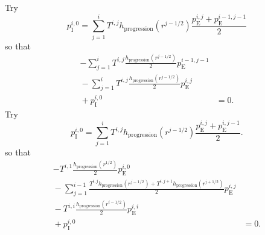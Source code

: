 \documentclass[12pt]{article}
\begin{document}
Try
\begin{equation}
  p_{\mathrm{I}}^{i, 0} =
  \sum_{j = 1}^i T^{i, j} h_{\text{progression}}(r^{j - 1 / 2})
  \frac{p_{\mathrm{E}}^{i, j} + p_{\mathrm{E}}^{i - 1, j - 1}}{2}
\end{equation}
so that
\begin{equation}
  \begin{split}
    - \sum_{j = 1}^i T^{i, j}
    \frac{h_{\text{progression}}(r^{j - 1 / 2})}{2}
    p_{\mathrm{E}}^{i - 1, j - 1}
    \\ {}
    - \sum_{j = 1}^i T^{i, j}
    \frac{h_{\text{progression}}(r^{j - 1 / 2})}{2}
    p_{\mathrm{E}}^{i, j}
    \\ {}
    + p_{\mathrm{I}}^{i, 0}
    & = 0.
  \end{split}
\end{equation}
%
Try
\begin{equation}
  p_{\mathrm{I}}^{i, 0} =
  \sum_{j = 1}^i T^{i, j} h_{\text{progression}}(r^{j - 1 / 2})
  \frac{p_{\mathrm{E}}^{i, j} + p_{\mathrm{E}}^{i, j - 1}}{2}.
\end{equation}
so that
\begin{equation}
  \begin{split}
    - T^{i, 1} \frac{h_{\text{progression}}(r^{1 / 2})}{2}
    p_{\mathrm{E}}^{i, 0}
    \\ {}
    - \sum_{j = 1}^{i - 1}
    \frac{
      T^{i, j} h_{\text{progression}}(r^{j - 1 / 2})
      + T^{i, j + 1} h_{\text{progression}}(r^{j + 1 / 2})}{2}
    p_{\mathrm{E}}^{i, j}
    \\ {}
    - T^{i, i}
    \frac{h_{\text{progression}}(r^{i - 1 / 2})}{2}
    p_{\mathrm{E}}^{i, i}
    \\ {}
    + p_{\mathrm{I}}^{i, 0}
    & = 0.
  \end{split}
\end{equation}




\end{document}
